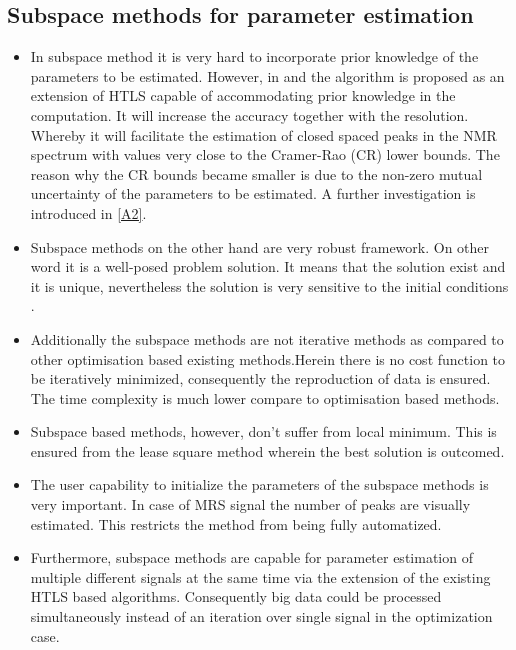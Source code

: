\subsection{Subspace methods for parameter estimation}

\begin{itemize}
 
 \item In subspace method it is very hard to incorporate prior knowledge of the parameters to be estimated. However, in \cite{7} and \cite{8} the algorithm is proposed as an extension of HTLS capable of accommodating prior knowledge in the computation. It will increase the accuracy together with the resolution. Whereby it will facilitate the estimation of closed spaced peaks in the NMR spectrum with values very close to the Cramer-Rao (CR) lower bounds. The reason why the CR bounds became smaller is due to the non-zero mutual uncertainty of the parameters to be estimated. A further investigation is introduced in \ref{A2}.
 
 \item Subspace methods on the other hand are very robust framework. On other word it is a well-posed problem solution. It means that the solution exist and it is unique, nevertheless the solution is very sensitive to the initial conditions \cite{9}.
 
 \item Additionally the subspace methods are not iterative methods as compared to other optimisation based existing methods.Herein there is no cost function to be iteratively minimized, consequently the reproduction of data is ensured\cite{10}. The time complexity is much lower compare to optimisation based methods.
 
 \item Subspace based methods, however, don't suffer from local minimum. This is ensured from the lease square method wherein the best solution is outcomed. 

\item The user capability to initialize the parameters of the subspace methods is very important. In case of MRS signal the number of peaks are visually estimated. This restricts the method from being fully automatized. 

\item Furthermore, subspace methods are capable for parameter estimation of multiple different signals at the same time via the extension of the existing HTLS based algorithms\cite{10}. Consequently big data could be processed simultaneously instead of an iteration over single signal in the optimization case.


\end{itemize}



\newpage








